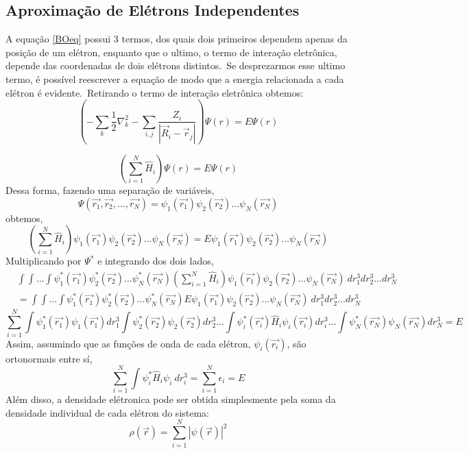 \subsection{Aproximação de Elétrons Independentes}
A equação \ref{BOeq} possui 3 termos, dos quais dois primeiros dependem apenas da posição de um elétron, enquanto que o ultimo, o termo de interação eletrônica, depende das coordenadas de dois elétrons distintos.\
Se desprezarmos esse ultimo termo, é possível reescrever a equação de modo que a energia relacionada a cada elétron é evidente.\
Retirando o termo de interação eletrônica obtemos:
\begin{equation}
    \left(-\sum_k \frac{1}{2}\nabla^2_{k} - \sum_{i,j} \frac{Z_i}{|\vec{R}_i-\vec{r}_j|} \right) \Psi(r) = E \Psi(r)
\end{equation}

\begin{equation}
    \left(\sum_{i=1}^{N}\hat H_i \right)\Psi(r) = E \Psi(r)
\end{equation}
Dessa forma, fazendo uma separação de variáveis, 
\begin{equation}
    \Psi(\vec{r_1},\vec{r_2},...,\vec{r_N}) = \psi_1(\vec{r_1})\psi_2(\vec{r_2})...\psi_N(\vec{r_N})
\end{equation}
obtemos,
\begin{equation}
    \left(\sum_{i=1}^{N}\hat H_i \right)\psi_1(\vec{r_1})\psi_2(\vec{r_2})...\psi_N(\vec{r_N}) = E \psi_1(\vec{r_1})\psi_2(\vec{r_2})...\psi_N(\vec{r_N})
\end{equation}
Multiplicando por $\Psi^*$ e integrando dos dois lados,
\begin{align}
    &\int\int...\int \psi^*_1(\vec{r_1})\psi^*_2(\vec{r_2})...\psi^*_N(\vec{r_N})\left(\sum_{i=1}^{N}\hat H_i \right)\psi_1(\vec{r_1})\psi_2(\vec{r_2})...\psi_N(\vec{r_N})~dr^3_1dr^3_2...dr^3_N \nonumber \\
    &= \int\int...\int \psi^*_1(\vec{r_1})\psi^*_2(\vec{r_2})...\psi^*_N(\vec{r_N}) E \psi_1(\vec{r_1})\psi_2(\vec{r_2})...\psi_N(\vec{r_N})~dr^3_1dr^3_2...dr^3_N
\end{align}
\begin{equation}
    \sum_{i=1}^{N}\int \psi^*_1(\vec{r_1})\psi_1(\vec{r_1})dr^3_1 \int \psi^*_2(\vec{r_2})\psi_2(\vec{r_2})dr^3_2...\int \psi^*_i(\vec{r_i}) \hat H_i \psi_i(\vec{r_i}) dr^3_i ... \int \psi^*_N(\vec{r_N})\psi_N(\vec{r_N})dr^3_N = E
\end{equation}
Assim, assumindo que as funções de onda de cada elétron, $\psi_i(\vec{r_i})$, são ortonormais entre sí,
\begin{equation}
    \sum_{i=1}^{N} \int \psi_i^* \hat H_i\psi_i~dr_i^3 = \sum_{i=1}^{N} \epsilon_i = E
\end{equation}
Além disso, a densidade elétronica pode ser obtida simplesmente pela soma da densidade individual de cada elétron do sistema:
\begin{equation}
    \rho(\vec{r}) = \sum_{i=1}^N |\psi(\vec{r})|^2
\end{equation}

